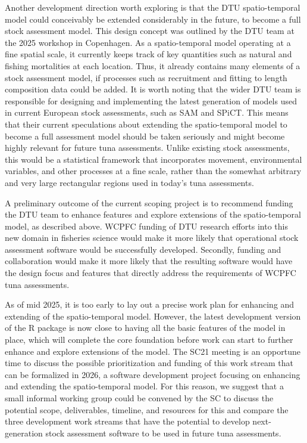 \documentclass{SCreport}
\begin{document}
Another development direction worth exploring is that the DTU spatio-temporal
model could conceivably be extended considerably in the future, to become a full
stock assessment model. This design concept was outlined by the DTU team at the
2025 workshop in Copenhagen. As a spatio-temporal model operating at a fine
spatial scale, it currently keeps track of key quantities such as natural and
fishing mortalities at each location. Thus, it already contains many elements of
a stock assessment model, if processes such as recruitment and fitting to length
composition data could be added. It is worth noting that the wider DTU team is
responsible for designing and implementing the latest generation of models used
in current European stock assessments, such as SAM and SPiCT. This means that
their current speculations about extending the spatio-temporal model to become a
full assessment model should be taken seriously and might become highly relevant
for future tuna assessments. Unlike existing stock assessments, this would be a
statistical framework that incorporates movement, environmental variables, and
other processes at a fine scale, rather than the somewhat arbitrary and very
large rectangular regions used in today's tuna assessments.

A preliminary outcome of the current scoping project is to recommend funding the
DTU team to enhance features and explore extensions of the spatio-temporal
model, as described above. WCPFC funding of DTU research efforts into this new
domain in fisheries science would make it more likely that operational stock
assessment software would be successfully developed. Secondly, funding and
collaboration would make it more likely that the resulting software would have
the design focus and features that directly address the requirements of WCPFC
tuna assessments.

As of mid 2025, it is too early to lay out a precise work plan for enhancing and
extending of the spatio-temporal model. However, the latest development version
of the R package is now close to having all the basic features of the model in
place, which will complete the core foundation before work can start to further
enhance and explore extensions of the model. The SC21 meeting is an opportune
time to discuss the possible prioritization and funding of this work stream that
can be formalized in 2026, a software development project focusing on enhancing
and extending the spatio-temporal model. For this reason, we suggest that a
small informal working group could be convened by the SC to discuss the
potential scope, deliverables, timeline, and resources for this and compare the
three development work streams that have the potential to develop
next-generation stock assessment software to be used in future tuna assessments.
\end{document}
